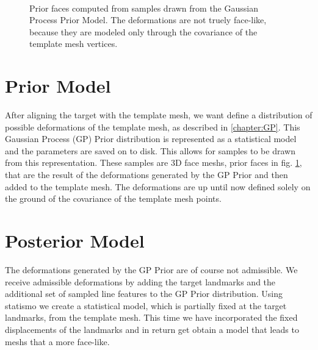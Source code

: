 \begin{figure}[h]
\centering
{}\\
\label{fig:priorprofile}
\caption{Prior faces computed from samples drawn from the Gaussian Process Prior Model. The deformations are not truely face-like, because they are modeled only through the covariance of the template mesh vertices.}
\end{figure}

\section{Prior Model}
After aligning the target with the template mesh, we want define a distribution of possible deformations of the template mesh, as described in \ref{chapter:GP}. This Gaussian Process (GP) Prior distribution is represented as a statistical model and the parameters are saved on to disk. This allows for samples to be drawn from this representation. These samples are 3D face meshs, prior faces in fig. \ref{fig:priorprofile}, that are the result of the deformations generated by the GP Prior and then added to the template mesh. The deformations are up until now defined solely on the ground of the covariance of the template mesh points.

\section{Posterior Model}
The deformations generated by the GP Prior are of course not admissible. We receive admissible deformations by adding the target landmarks and the additional set of sampled line features to the GP Prior distribution. Using statismo we create a statistical model, which is partially fixed at the target landmarks, from the template mesh. This time we have incorporated the fixed displacements of the landmarks and in return get obtain a model that leads to meshs that a more
face-like.

